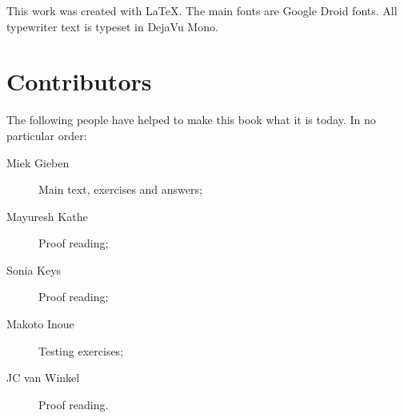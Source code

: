 \noindent{}This work was created with \LaTeX. The main fonts are Google Droid
fonts. All typewriter text is typeset in DejaVu Mono.

\section{Contributors}
The following people have helped to make this book what it is today.
In no particular order:
\begin{description}
\item[Miek Gieben] 
{Main text, exercises and answers;}
\item[Mayuresh Kathe]
{Proof reading;}
\item[Sonia Keys]
{Proof reading;}
\item[Makoto Inoue]
{Testing exercises;}
\item[JC van Winkel]
{Proof reading.}
\end{description}
